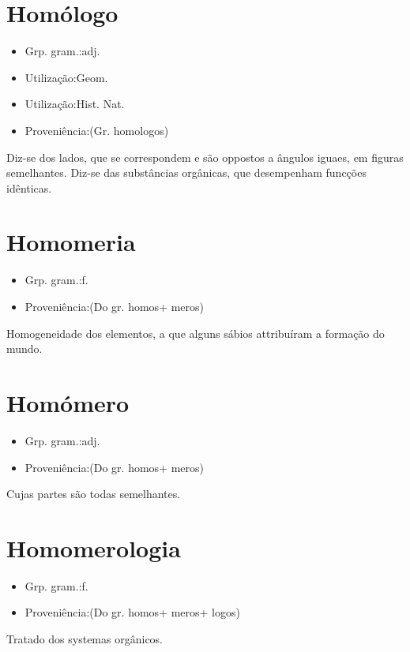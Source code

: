 \documentclass{article}
\begin{document}
\section{Homólogo}
\begin{itemize}
\item {Grp. gram.:adj.}
\end{itemize}
\begin{itemize}
\item {Utilização:Geom.}
\end{itemize}
\begin{itemize}
\item {Utilização:Hist. Nat.}
\end{itemize}
\begin{itemize}
\item {Proveniência:(Gr. \textunderscore homologos\textunderscore )}
\end{itemize}
Diz-se dos lados, que se correspondem e são oppostos a ângulos iguaes, em figuras semelhantes.
Diz-se das substâncias orgânicas, que desempenham funcções idênticas.
\section{Homomeria}
\begin{itemize}
\item {Grp. gram.:f.}
\end{itemize}
\begin{itemize}
\item {Proveniência:(Do gr. \textunderscore homos\textunderscore  + \textunderscore meros\textunderscore )}
\end{itemize}
Homogeneidade dos elementos, a que alguns sábios attribuíram a formação do mundo.
\section{Homómero}
\begin{itemize}
\item {Grp. gram.:adj.}
\end{itemize}
\begin{itemize}
\item {Proveniência:(Do gr. \textunderscore homos\textunderscore  + \textunderscore meros\textunderscore )}
\end{itemize}
Cujas partes são todas semelhantes.
\section{Homomerologia}
\begin{itemize}
\item {Grp. gram.:f.}
\end{itemize}
\begin{itemize}
\item {Proveniência:(Do gr. \textunderscore homos\textunderscore  + \textunderscore meros\textunderscore  + \textunderscore logos\textunderscore )}
\end{itemize}
Tratado dos systemas orgânicos.
\end{document}
